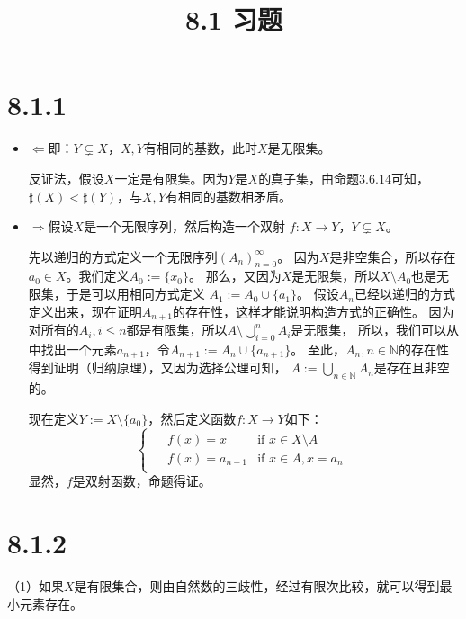 \documentclass{article}
\theoremstyle{mystyle}
\begin{document}
\title{8.1 习题}
\maketitle

\section*{8.1.1}

\begin{itemize}
  \item $\Leftarrow$即：$Y \subsetneq X$，$X,Y$有相同的基数，此时$X$是无限集。

        反证法，假设$X$一定是有限集。因为$Y$是$X$的真子集，由命题3.6.14可知，
        $\sharp(X) < \sharp(Y)$，与$X,Y$有相同的基数相矛盾。
  \item $\Rightarrow$假设$X$是一个无限序列，然后构造一个双射
        $f: X \rightarrow Y$，$Y \subsetneq X$。

        先以递归的方式定义一个无限序列$(A_n)_{n=0}^\infty$。
        因为$X$是非空集合，所以存在$a_0 \in X$。我们定义$A_0 := \{x_0\}$。
        那么，又因为$X$是无限集，所以$X \setminus A_0$也是无限集，于是可以用相同方式定义
        $A_1 := A_0 \cup \{a_1\}$。
        假设$A_n$已经以递归的方式定义出来，现在证明$A_{n+1}$的存在性，这样才能说明构造方式的正确性。
        因为对所有的$A_i, i \leq n$都是有限集，所以$A \setminus \bigcup _{i=0}^n A_i$是无限集，
        所以，我们可以从中找出一个元素$a_{n+1}$，令$A_{n+1} := A_n \cup \{a_{n+1}\}$。
        至此，$A_n, n \in \mathbb{N}$的存在性得到证明（归纳原理），又因为选择公理可知，
        $A := \bigcup _{n \in \mathbb{N}} A_n$是存在且非空的。

        现在定义$Y := X \setminus \{ a_0 \}$，然后定义函数$f: X \rightarrow Y$如下：
        \begin{equation*}
          \begin{cases*}
            \begin{aligned}
               & f(x) = x       & \text{if } x \in X \setminus A \\
               & f(x) = a_{n+1} & \text{if } x \in A, x = a_n
            \end{aligned}
          \end{cases*}
        \end{equation*}
        显然，$f$是双射函数，命题得证。




\end{itemize}

\section*{8.1.2}
（1）如果$X$是有限集合，则由自然数的三歧性，经过有限次比较，就可以得到最小元素存在。
\end{document}
